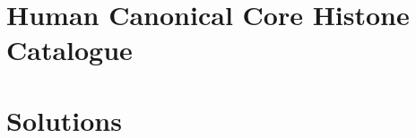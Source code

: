 \appendix

\chapter{Human Canonical Core Histone Catalogue}

\chapter{Solutions}
  \label{app:solutions}


